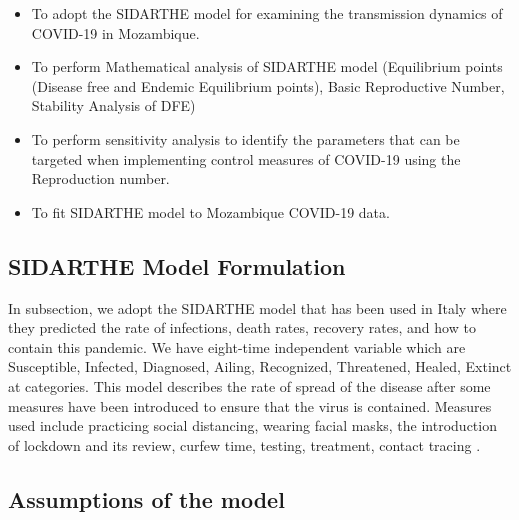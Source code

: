 \documentclass{article}
\begin{document}
\begin{itemize}
\item To adopt the SIDARTHE model for examining the transmission dynamics of COVID-19 in Mozambique.
\item To perform Mathematical analysis of SIDARTHE model (Equilibrium points (Disease free and Endemic Equilibrium points), Basic Reproductive Number, Stability Analysis of DFE)
\item To perform sensitivity analysis to identify the parameters that can be targeted when implementing control measures of COVID-19 using the Reproduction number.   
\item To fit SIDARTHE model to Mozambique COVID-19 data.
\end{itemize}

\subsection{SIDARTHE Model Formulation}

 In subsection, we adopt the \citep{giordano2020modelling} SIDARTHE model that has been used in Italy where they predicted the rate of infections, death rates, recovery rates, and how to contain this pandemic. We have eight-time independent variable which are Susceptible, Infected, Diagnosed, Ailing, Recognized, Threatened, Healed, Extinct at categories. This model describes the rate of spread of the disease after some measures have been introduced to ensure that the virus is contained. Measures used include practicing social distancing, wearing facial masks, the introduction of lockdown and its review, curfew time, testing, treatment, contact tracing \citep{assamagan2020study}.
 
 \subsection*{Assumptions of the model}\label{Assumptions:1}
\end{document}
